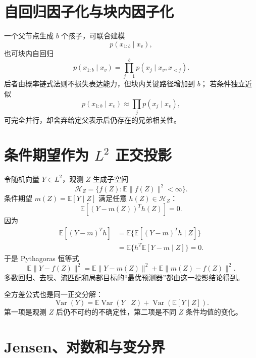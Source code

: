 \documentclass[11pt]{article}
\numberwithin{equation}{section}
\newcommand{\E}{\mathbb{E}}
\newcommand{\1}{\mathbf{1}}
\newcommand{\Var}{\operatorname{Var}}
\begin{document}
\section{自回归因子化与块内因子化}

一个父节点生成 $b$ 个孩子，可联合建模
\begin{equation}
 p(x_{1:b}\mid x_v),
\end{equation}
也可块内自回归
\begin{equation}
 p(x_{1:b}\mid x_v)=
 \prod_{j=1}^{b}p(x_j\mid x_v,x_{<j}).
\end{equation}
后者由概率链式法则不损失表达能力，但块内关键路径增加到 $b$；
若条件独立近似
\begin{equation}
 p(x_{1:b}\mid x_v)\approx\prod_jp(x_j\mid x_v),
\end{equation}
可完全并行，却舍弃给定父表示后仍存在的兄弟相关性。

\section{条件期望作为 $L^2$ 正交投影}

令随机向量 $Y\in L^2$，观测 $Z$ 生成子空间
\begin{equation}
 \mathcal H_Z=\{f(Z):\E\|f(Z)\|^2<\infty\}.
\end{equation}
条件期望 $m(Z)=\E[Y\mid Z]$ 满足任意 $h(Z)\in\mathcal H_Z$：
\begin{equation}
 \E[(Y-m(Z))^Th(Z)]=0.
\end{equation}
因为
\begin{align}
 \E[(Y-m)^Th]
 &=\E\{\E[(Y-m)^Th\mid Z]\}\\
 &=\E\{h^T\E[Y-m\mid Z]\}=0.
\end{align}
于是 Pythagoras 恒等式
\begin{equation}
 \E\|Y-f(Z)\|^2
 =\E\|Y-m(Z)\|^2+\E\|m(Z)-f(Z)\|^2.
\end{equation}
多数回归、去噪、流匹配和局部目标的“最优预测器”都由这一投影结论得到。

全方差公式也是同一正交分解：
\begin{equation}
 \Var(Y)=\E\Var(Y\mid Z)+\Var(\E[Y\mid Z]).
\end{equation}
第一项是观测 $Z$ 后仍不可约的不确定性，第二项是不同 $Z$ 条件均值的变化。

\section{Jensen、对数和与变分界}
\end{document}
